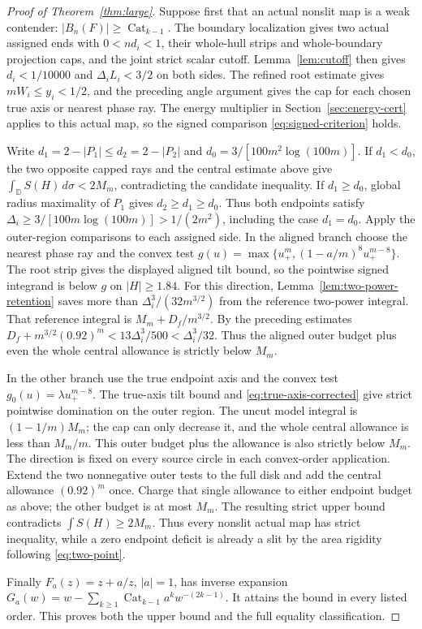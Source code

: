 \documentclass[11pt]{article}
\newcommand{\D}{\mathbb D}
\newcommand{\Cat}{\operatorname{Cat}}
\begin{document}
	\begin{proof}[Proof of Theorem~\ref{thm:large}]
		Suppose first that an actual nonslit map is a weak contender:
		$|B_n(F)|\geq\Cat_{k-1}$.  The boundary localization gives two
		actual assigned ends with $0<nd_i<1$, their whole-hull strips and
		whole-boundary projection caps, and the joint strict scalar cutoff.
		Lemma~\ref{lem:cutoff} then gives $d_i<1/10000$ and
		$\Delta_iL_i<3/2$ on both sides.  The refined root estimate gives
		$mW_i\leq y_i<1/2$, and the preceding angle argument gives the
		cap for each chosen true axis or nearest phase ray.  The energy
		multiplier in Section~\ref{sec:energy-cert} applies to this actual
		map, so the signed comparison \eqref{eq:signed-criterion} holds.
		
		Write $d_1=2-|P_1|\leq d_2=2-|P_2|$ and
		$d_0=3/[100m^2\log(100m)]$.  If $d_1<d_0$, the two
		opposite capped rays and the central estimate above give
		$\int_{\D}S(H)\,d\sigma<2M_m$, contradicting the candidate
		inequality.  If $d_1\geq d_0$, global radius maximality of $P_1$
		gives $d_2\geq d_1\geq d_0$.  Thus both endpoints satisfy
		$\Delta_i\geq3/[100m\log(100m)]>1/(2m^2)$, including the
		case $d_1=d_0$.  Apply the outer-region comparisons to each
		assigned side.  In the aligned branch choose the nearest phase ray
		and the convex test $g(u)=\max\{u_+^m,(1-a/m)^8u_+^{m-8}\}$.
		The root strip gives the displayed aligned tilt bound, so the
		pointwise signed integrand is below $g$ on $|H|\geq1.84$.
		For this direction, Lemma~\ref{lem:two-power-retention} saves more
		than $\Delta_i^3/(32m^{3/2})$ from the reference two-power integral.
		That reference integral is $M_m+D_f/m^{3/2}$.  By the preceding
		estimates $D_f+m^{3/2}(0.92)^m
		<13\Delta_i^3/500<\Delta_i^3/32$.  Thus the aligned outer
		budget plus even the whole central allowance is strictly below $M_m$.
		
		In the other branch use the true endpoint axis and the convex test
		$g_0(u)=\lambda u_+^{m-8}$.  The true-axis tilt bound and
		\eqref{eq:true-axis-corrected} give strict pointwise domination
		on the outer region.  The uncut model integral is
		$(1-1/m)M_m$; the cap can only decrease it, and the whole central
		allowance is less than $M_m/m$.  This outer budget plus the
		allowance is also strictly below $M_m$.  The direction is fixed on
		every source circle in each convex-order application.  Extend the
		two nonnegative outer tests to the full disk and add the central
		allowance $(0.92)^m$ once.  Charge that single allowance to either
		endpoint budget as above; the other budget is at most $M_m$.
		The resulting strict upper bound contradicts
		$\int S(H)\geq2M_m$.  Thus every nonslit actual map has strict
		inequality, while a zero endpoint deficit is already a slit by the
		area rigidity following \eqref{eq:two-point}.
		
		Finally $F_a(z)=z+a/z$, $|a|=1$, has inverse expansion
		$G_a(w)=w-\sum_{k\geq1}\Cat_{k-1}a^k w^{-(2k-1)}$.
		It attains the bound in every listed order.  This proves both the
		upper bound and the full equality classification.
	\end{proof}
\end{document}
